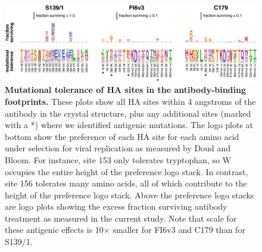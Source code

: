 \documentclass[11pt]{article}
\begin{document}
\begin{figure}
\centerline{\includegraphics[width=\textwidth]{Fig7.pdf}}
\caption{
\label{fig:muttolerance}
{\bf Mutational tolerance of HA sites in the antibody-binding footprints.}
These plots show all HA sites within 4 angstroms of the antibody in the crystal structure, plus any additional sites (marked with a *) where we identified antigenic mutations. 
The logo plots at bottom show the preference of each HA site for each amino acid under selection for viral replication as measured by Doud and Bloom\cite{doud2016accurate}.
For instance, site 153 only tolerates tryptophan, so W occupies the entire height of the preference logo stack.
In contrast, site 156 tolerates many amino acids, all of which contribute to the height of the preference logo stack. 
Above the preference logo stacks are logo plots showing the excess fraction surviving antibody treatment as measured in the current study.
Note that scale for these antigenic effects is 10$\times$ smaller for FI6v3 and C179 than for S139/1.
}
\end{figure}
\end{document}
